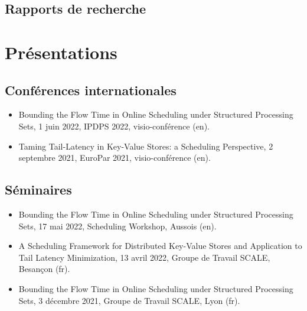 \documentclass[12pt]{article}
\begin{document}

\subsection*{Rapports de recherche}




\section*{Présentations}

\subsection*{Conférences internationales}

\begin{itemize}
  \item \foreignlanguage{english}{Bounding the Flow Time in Online Scheduling under Structured
  Processing Sets}, 1 juin 2022, IPDPS 2022, visio-conférence (en).
  \item \foreignlanguage{english}{Taming Tail-Latency in Key-Value Stores: a Scheduling
  Perspective}, 2 septembre 2021, EuroPar 2021, visio-conférence (en).
\end{itemize}

\subsection*{Séminaires}

\begin{itemize}
  \item \foreignlanguage{english}{Bounding the Flow Time in Online Scheduling under Structured
  Processing Sets}, 17 mai 2022, Scheduling Workshop, Aussois (en).
  \item \foreignlanguage{english}{A Scheduling Framework for Distributed Key-Value Stores and
  Application to Tail Latency Minimization}, 13 avril 2022, Groupe de Travail SCALE, Besançon (fr).
  \item \foreignlanguage{english}{Bounding the Flow Time in Online Scheduling under Structured
  Processing Sets}, 3 décembre 2021, Groupe de Travail SCALE, Lyon (fr).
\end{itemize}

% 
% 
\end{document}
